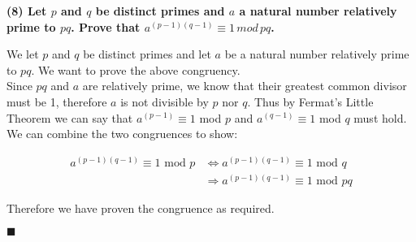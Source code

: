 \documentclass[20pt]{article}
\begin{document}
\noindent
\textbf{(8) Let $p$ and $q$ be distinct primes and $a$ a natural number relatively prime to $pq$. Prove that $a^{(p-1)(q-1)} \equiv 1 \, mod \, pq$.}
\begin{text}
    \noindent
    We let $p$ and $q$ be distinct primes and let $a$ be a natural number relatively prime to $pq$. We want to prove the above congruency.\\
    
    \noindent
    Since $pq$ and $a$ are relatively prime, we know that their greatest common divisor must be 1, therefore $a$ is not divisible by $p$ nor $q$. Thus by Fermat's Little Theorem we can say that $a^{(p-1)} \equiv 1$ mod $p$ and $a^{(q-1)} \equiv 1$ mod $q$ must hold. We can combine the two congruences to show:
    
    \begin{align}
        a^{(p-1)(q-1)} \equiv 1 \text{ mod } p &\iff a^{(p-1)(q-1)} \equiv 1 \text{ mod } q\nonumber\\
        &\Longrightarrow a^{(p-1)(q-1)} \equiv 1 \text{ mod } pq\tag{By question 7}\nonumber
    \end{align}
    
    \noindent
    Therefore we have proven the congruence as required.
    
    \hfill $\blacksquare$
\end{text}\\
\end{document}

